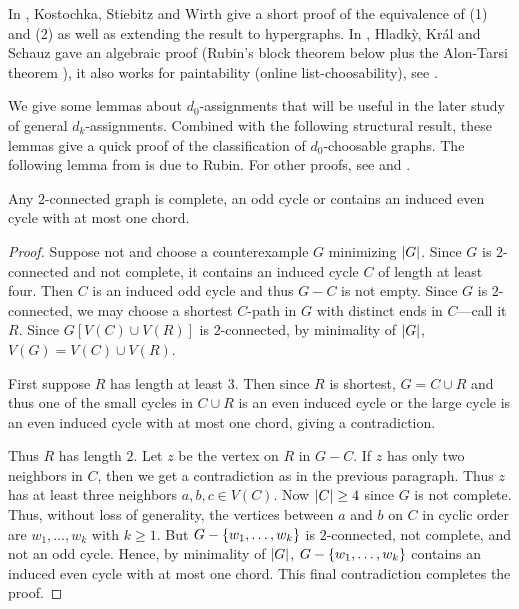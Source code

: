 In \cite{BrooksExtended}, Kostochka, Stiebitz and Wirth give a short proof of the equivalence of (1) and (2) as well as extending the result to hypergraphs.  In \cite{Hladky}, Hladk{\`y}, Kr{\'a}l and Schauz gave an algebraic proof (Rubin's block theorem below plus the Alon-Tarsi theorem \cite{Alon1992125}), it also works for paintability (online list-choosability), see \cite{schauz2009mr}.

We give some lemmas about $d_0$-assignments that will be useful in the later study of general $d_k$-assignments.  Combined with the following structural result, these lemmas give a quick proof of the classification of $d_0$-choosable graphs. The following lemma from \cite{erdos1979choosability} is due to Rubin.  For other proofs, see \cite{Entringer1985367} and \cite{Hladky}.

\begin{lem}\label{gallaitreeevencycle}
Any $2$-connected graph is complete, an odd cycle or contains an induced even cycle with at most one chord.
\end{lem}
\begin{proof}
Suppose not and choose a counterexample $G$ minimizing $\left|G\right|$. Since $G$ is
$2$-connected and not complete, it contains an induced cycle $C$ of length at
least four. Then $C$ is an induced odd cycle and thus $G-C$ is not empty.  Since
$G$ is $2$-connected, we may choose a shortest $C$-path in $G$ with distinct ends in $C$---call it $R$.  Since $G[V(C) \cup V(R)]$ is $2$-connected, by minimality of $\left|G\right|$, $V(G) = V(C) \cup V(R)$.

First suppose $R$ has length at least $3$.  Then since $R$ is shortest, $G = C \cup R$ and thus one of the small cycles in $C \cup R$ is an even induced cycle or the large cycle is an even induced cycle with at most one chord, giving a contradiction.

Thus $R$ has length $2$.  Let $z$ be the vertex on $R$ in $G-C$.  If $z$ has only two neighbors in $C$, then we get a contradiction as in the previous paragraph.  Thus $z$ has at least three neighbors $a,b,c \in V(C)$.  Now $\left|C\right| \geq 4$ since $G$ is not complete.  Thus, without loss of generality, the vertices between $a$ and $b$ on $C$ in cyclic order are $w_1, \ldots, w_k$ with $k \geq 1$.  But $G - \left\{ w_1,\ldots, w_k \right\}$ is $2$-connected, not complete, and not an odd cycle.  Hence, by minimality of $\left|G\right|$, $G - \left\{ w_1,\ldots, w_k \right\}$ contains an induced even cycle with at most one chord.  This final contradiction completes the proof.
\end{proof}

